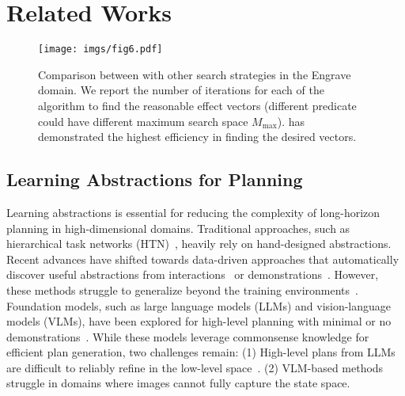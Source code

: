 \section{Related Works}
\begin{figure}[!t]
	\centering
	\texttt{[image: imgs/fig6.pdf]}
	\caption{Comparison between \model{} with other search strategies in the Engrave domain. We report the number of iterations for each of the algorithm to find the reasonable effect vectors (different predicate could have different maximum search space $M_{\mathrm{max}}$). \model{} has demonstrated the highest efficiency in finding the desired vectors.}
    \vspace{-0.3cm}
	\label{fig:abla_search}
\end{figure}

\subsection{Learning Abstractions for Planning}
Learning abstractions is essential for reducing the complexity of long-horizon planning in high-dimensional domains.
Traditional approaches, such as hierarchical task networks (HTN)~\cite{kaelbling2011htn}, heavily rely on hand-designed abstractions.
Recent advances have shifted towards data-driven approaches that automatically discover useful abstractions from interactions~\cite{gupta2020relay,Soroush2022maple,hansen2022bisimulation,dong2019nlm,chitnis2021glib} or demonstrations~\cite{sharmadirected,kipf2019compile,chitnis2021nsrt,mao2022pdsketch}.
However, these methods struggle to generalize beyond the training environments~\cite{liang2024visualpredicator}.
Foundation models, such as large language models (LLMs) and vision-language models (VLMs), have been explored for high-level planning with minimal or no demonstrations~\cite{liu2024BLADE,fang2024keypoint,liang2024visualpredicator,silver2024generalized,wei2022cot,han2024interpret,huang2023voxposer,hu2023look,kumar2024openworld}. 
While these models leverage commonsense knowledge for efficient plan generation, two challenges remain:
(1) High-level plans from LLMs~\cite{silver2024generalized,han2024interpret,wei2022cot,huang2023voxposer} are difficult to reliably refine in the low-level space~\cite{liang2024visualpredicator}.
(2) VLM-based methods~\cite{liang2024visualpredicator,fang2024keypoint,kumar2024openworld,yang2024guidinglonghorizontaskmotion} struggle in domains where images cannot fully capture the state space.

